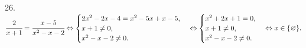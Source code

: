 26. $\cfrac{2}{x+1}=\cfrac{x-5}{x^2-x-2}\Leftrightarrow\begin{cases}
2x^2-2x-4=x^2-5x+x-5,\\
x+1\neq0,\\ x^2-x-2\neq0.\end{cases}\Leftrightarrow  \begin{cases}
x^2+2x+1=0,\\
x+1\neq0,\\ x^2-x-2\neq0.\end{cases}\Leftrightarrow x\in\{\varnothing\}.$\\

